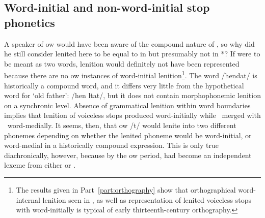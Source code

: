 \subsection{Word-initial and non-word-initial stop phonetics}
\label{sec:word-initial-non}
A speaker of \gls{ow} would have been aware of the compound nature of , so why did he still consider lenited  here to be equal to  in  but presumably not in *? If  were to be meant  as two words, lenition would definitely not have been represented because there are no \gls{ow} instances of word-initial lenition\footnote{The results given in Part~\ref{part:orthography} show that orthographical word-internal lenition seen in , as well as representation of lenited voiceless stops with  word-initially is typical of early thirteenth-century orthography.}.  The word  /hendat/ is historically  a compound word, and it differs very little from the hypothetical word for `old father':  /hen \gls{l}tat/, but it does not contain morphophonemic lenition on a synchronic level. Absence of grammatical lenition within word boundaries implies that lenition of voiceless stops produced \lT word-initially while \lT\  merged with \xD\ word-medially. It seems, then, that \gls{ow} /t/ would lenite into two different phonemes depending on whether the lenited phoneme would be word-initial, or word-medial in a historically compound expression. This is only true diachronically, however, because by the \gls{ow} period,  had become an independent lexeme from either  or . 


